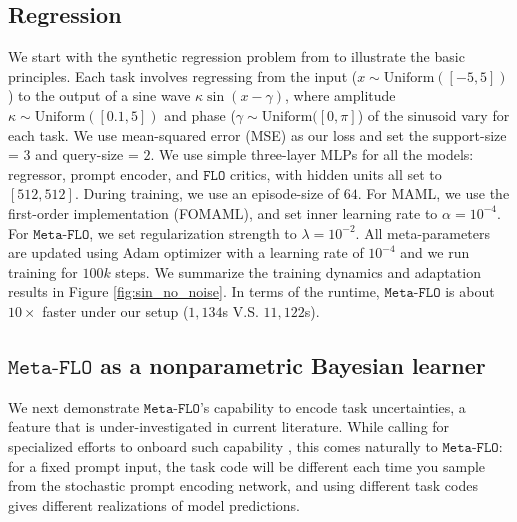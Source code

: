 \documentclass[nohyperref]{article}
\theoremstyle{plain}
\theoremstyle{definition}
\theoremstyle{remark}
\newcommand{\FLO}{\texttt{FLO}}
\newcommand{\metaflo}{\texttt{Meta-FLO} }
\begin{document}
\subsection{Regression}

We start with the synthetic regression problem from \citep{finn2017model} to illustrate the basic principles. Each task involves regressing from the input ($x\sim \text{Uniform}([-5,5])$) to the output of a sine wave $\kappa \sin(x-\gamma)$, where amplitude $\kappa \sim \text{Uniform}([0.1,5])$ and phase ($\gamma \sim \text{Uniform}([0,\pi]$) of the sinusoid vary for each task. We use mean-squared error (MSE) as our loss and set the support-size = $3$ and query-size = $2$. We use simple three-layer MLPs for all the models: regressor, prompt encoder, and $\FLO$ critics, with hidden units all set to $[512, 512]$. During training, we use an episode-size of $64$. For MAML, we use the first-order implementation (FOMAML), and set inner learning rate to $\alpha=10^{-4}$. For $\metaflo$, we set regularization strength to $\lambda=10^{-2}$. All meta-parameters are updated using Adam optimizer with a learning rate of $10^{-4}$ and we run training for $100k$ steps. We summarize the training dynamics and adaptation results in Figure \ref{fig:sin_no_noise}. In terms of the runtime, $\metaflo$ is about $10\times$ faster under our setup ($1,134$s V.S. $11,122$s). 

\subsection{$\metaflo$ as a nonparametric Bayesian learner}

We next demonstrate $\metaflo$'s capability to encode task uncertainties, a feature that is under-investigated in current literature. While calling for specialized efforts to onboard such capability \citep{yoon2018bayesian}, this comes naturally to $\metaflo$: for a fixed prompt input, the task code will be different each time you sample from the stochastic prompt encoding network, and using different task codes gives different realizations of model predictions. 
\end{document}
